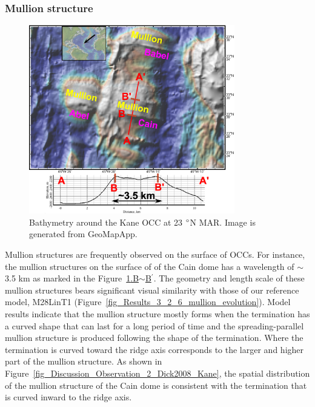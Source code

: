\subsubsection{Mullion structure}

\begin{figure}[h]
  \centering
    \includegraphics[width=0.8\textwidth]{./Figures/fig_Discussion_Observation_5_Mullion_Kane.eps}
  \caption[Bathymetry around the Kane OCC at 23 $\degree$N MAR.]{Bathymetry around the Kane OCC at 23 $\degree$N MAR. Image is generated from GeoMapApp.}
 \label{fig_Discussion_Observation_5_Mullion_Kane}
\end{figure}   

Mullion structures are frequently observed on the surface of OCCs. For instance, the mullion structures on the surface of of the Cain dome has a wavelength of $\sim$3.5 km as marked in the Figure~\hyperref[fig_Discussion_Observation_5_Mullion_Kane]{\ref{fig_Discussion_Observation_5_Mullion_Kane}.B$\sim$B$^\prime$}. The geometry and length scale of these mullion structures bears significant visual similarity with those of our reference model, M28LinT1 (Figure~\hyperref[fig_Results_3_2_6_mullion_evolution]{\ref{fig_Results_3_2_6_mullion_evolution}}). Model results indicate that the mullion structure mostly forms when the termination has a curved shape that can last for a long period of time and the spreading-parallel mullion structure is produced following the shape of the termination. Where the termination is curved toward the ridge axis corresponds to the larger and higher part of the mullion structure. As shown in Figure~\hyperref[fig_Discussion_Observation_2_Dick2008_Kane]{\ref{fig_Discussion_Observation_2_Dick2008_Kane}}, the spatial distribution of the mullion structure of the Cain dome is consistent with the termination that is curved inward to the ridge axis.

